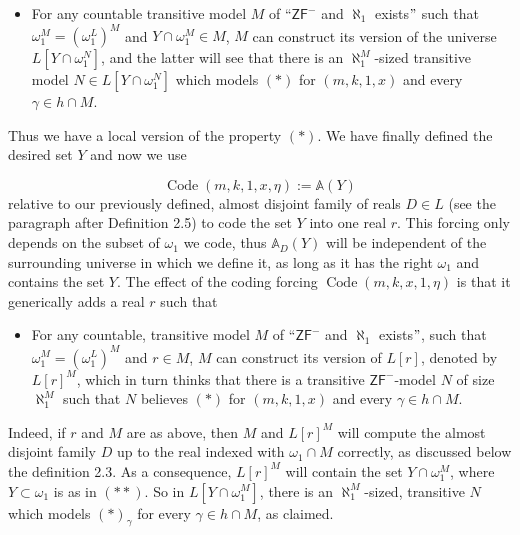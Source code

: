 \documentclass[a4paper,11pt]{article}
\newcommand{\ZFP}{\mathsf{ZF}^-}
\begin{document}
    \begin{itemize}
    
    \item[$({\ast}{\ast})$] For any countable transitive model $M$ of  ``$\ZFP$ and $\aleph_1$ exists$"$ such that $\omega_1^M=(\omega_1^L)^M$ and $ Y \cap \omega_1^M \in M$, $M$ can construct its version of the universe $L[Y \cap \omega_1^N]$, and the latter will see that there is an $\aleph_1^M$-sized transitive model $N \in L[Y \cap \omega_1^N]$ which models $(\ast)$ for $(m,k,1,x)$ and every $\gamma \in h \cap M$.
   
    \end{itemize}
    
    Thus we have a local version of the property $(\ast)$. We have finally defined the desired set $Y$ and now we use 
    
    \[\operatorname{Code} (m,k,1,x,\eta):= \mathbb{A} (Y) \]
relative to our previously defined, almost disjoint family of reals $D \in  L $ (see the paragraph after Definition 2.5)  to code the set $Y$ into one real $r$. This forcing only depends on the subset of $\omega_1$ we code, thus $\mathbb{A}_D(Y)$ will be independent of the surrounding universe in which we define it, as long as it has the right $\omega_1$ and contains the set $Y$. The effect of the coding forcing $\operatorname{Code} (m,k,x,1,\eta)$ is that it generically adds a real $r$ such that
    
    \begin{itemize}
    ﻿
    \item[$({\ast}{\ast}{\ast})$] For any countable, transitive model $M$ of ``$\ZFP$ and $\aleph_1$ exists$"$, such that $\omega_1^M=(\omega_1^L)^M$ and $ r  \in M$, $M$ can construct its version of $L[r]$, denoted by $L[r]^M$, which in turn thinks that there is a transitive $\ZFP$-model $N$ of size $\aleph_1^M$  such that $N$ believes $(\ast)$ for $(m,k,1,x)$ and every $\gamma \in h \cap M$.
    ﻿
    \end{itemize}
    
    Indeed, if $r$ and $M$ are as above, then $M$ and $L[r]^M$ will compute the almost disjoint family $D$ up to the real indexed with $\omega_1 \cap M$ correctly, as discussed below the definition 2.3. As a consequence, $L[r]^M$ will contain the set $Y \cap \omega_1^M$, where $Y \subset \omega_1$ is as in $(\ast\ast)$. So in $L[Y \cap \omega_1^M]$, there is an $\aleph_1^M$-sized, transitive $N$ which models $(\ast)_{\gamma}$ for every $\gamma \in h \cap M$, as claimed.
   
\end{document}
